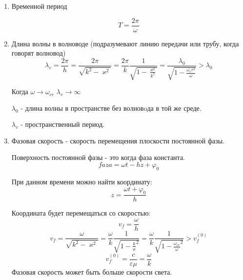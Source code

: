 \documentclass[a4paper,14pt]{extarticle}
\renewcommand{\phi}{\varphi}
\renewcommand{\kappa}{\varkappa}
\begin{document}
\begin{enumerate}
	\item Временной период 
	
	\begin{equation*}
	T = \frac{2 \pi}{\omega}
	\end{equation*}
	
	\item Длина волны в волноводе (подразумевают линию передачи или трубу, когда говорят волновод)
	\begin{equation*}
	\lambda_v = \frac{2 \pi}{h} = \frac{2 \pi}{\sqrt{k^2 - \kappa^2}} = \frac{2 \pi}{k} \frac{1}{\sqrt{1 - \frac{\kappa^2}{k^2}}} = \frac{\lambda_0}{\sqrt{1 - \frac{\omega_cr^2}{\omega}}} > \lambda_0
	\end{equation*}
	
	Когда $\omega \rightarrow \omega_{cr}$	$\lambda_{v} \rightarrow \infty$
	
	$\lambda_0$ - длина волны в пространстве без волновoда в той же среде.
	
	$\lambda_{v}$ - пространственный период.
	
	\item Фазовая скорость - скорость перемещения плоскости постоянной фазы.
	
	Поверхность постоянной фазы - это когда фаза константа.
	\begin{equation*}
	faza = \omega t - h z + \phi_0
	\end{equation*}
	
	При данном времени можно найти координату:
	\begin{equation*}
	z = \frac{\omega t  + \phi_0}{ h }
	\end{equation*}
	
	Координата будет перемещаться со скоростью:
	\begin{equation*}
	v_f = \frac{\omega}{h}
	\end{equation*}
	\begin{equation*}
	v_f = 
	\frac{\omega}{\sqrt{k^2 - \kappa^2}} = 
	\frac{\omega}{k} \frac{1}{\sqrt{1 - {\frac{k}{\kappa}^2}}} = \frac{\omega}{k} \frac{1}{\sqrt{1 - {\frac{\omega_{cr}}{\omega}^2}}} > v_f^{(0)}
	\end{equation*}
	\begin{equation*}
	v_f^{(0)} = \frac{c}{\varepsilon \mu} = \frac{\omega}{k}
	\end{equation*}
	Фазовая скорость может быть больше скорости света.
	

\end{enumerate}
\end{document}
